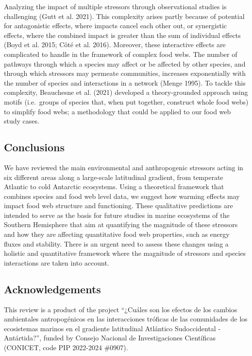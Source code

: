 \documentclass[
]{article}
\begin{document}
Analyzing the impact of multiple stressors through observational studies
is challenging (Gutt et al. 2021). This complexity arises partly because
of potential for antagonistic effects, where impacts cancel each other
out, or synergistic effects, where the combined impact is greater than
the sum of individual effects (Boyd et al. 2015; Côté et al. 2016).
Moreover, these interactive effects are complicated to handle in the
framework of complex food webs. The number of pathways through which a
species may affect or be affected by other species, and through which
stressors may permeate communities, increases exponentially with the
number of species and interactions in a network (Menge 1995). To tackle
this complexity, Beauchesne et al. (2021) developed a theory-grounded
approach using motifs (i.e.~groups of species that, when put together,
construct whole food webs) to simplify food webs; a methodology that
could be applied to our food web study cases.

\subsection{Conclusions}\label{conclusions}

We have reviewed the main environmental and anthropogenic stressors
acting in six different areas along a large-scale latitudinal gradient,
from temperate Atlantic to cold Antarctic ecosystems. Using a
theoretical framework that combines species and food web level data, we
suggest how warming effects may impact food web structure and
functioning. These qualitative predictions are intended to serve as the
basis for future studies in marine ecosystems of the Southern Hemisphere
that aim at quantifying the magnitude of these stressors and how they
are affecting quantitative food web properties, such as energy fluxes
and stability. There is an urgent need to assess these changes using a
holistic and quantitative framework where the magnitude of stressors and
species interactions are taken into account.

\subsection{Acknowledgements}\label{acknowledgements}

This review is a product of the project ``¿Cuáles son los efectos de los
cambios ambientales antropogénicos en las interacciones tróficas de las
comunidades de los ecosistemas marinos en el gradiente latitudinal
Atlántico Sudoccidental - Antártida?'', funded by Consejo Nacional de
Investigaciones Científicas (CONICET, code PIP 2022-2024 \#0907).
\end{document}
